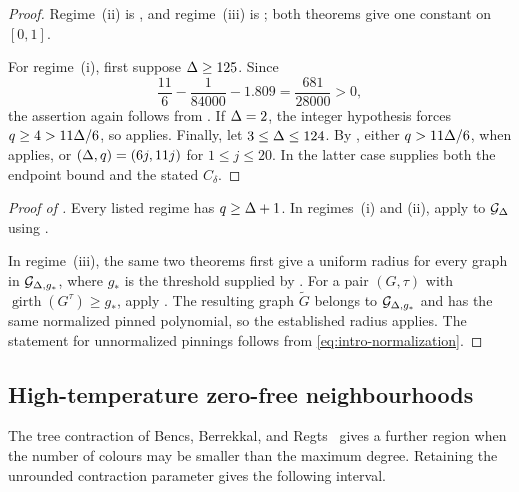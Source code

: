 \begin{proof}
Regime~\textup{(ii)} is , and regime~\textup{(iii)} is
; both theorems give one constant on
\([0,1]\).

For regime~\textup{(i)}, first suppose \(\Delta\ge125\).  Since
\[
  \frac{11}{6}-\frac1{84000}-1.809=\frac{681}{28000}>0,
\]
the assertion again follows from .  If \(\Delta=2\), the
integer hypothesis forces \(q\ge4>11\Delta/6\), so
 applies.  Finally, let \(3\le\Delta\le124\).
By , either \(q>11\Delta/6\), when
 applies, or \((\Delta,q)=(6j,11j)\) for
\(1\le j\le20\).  In the latter case
 supplies both the endpoint bound and the
stated \(C_\delta\).
\end{proof}

\begin{proof}[Proof of ]
Every listed regime has \(q\ge\Delta+1\).  In regimes~\textup{(i)} and
\textup{(ii)}, apply  to \(\mathcal{G}_{\Delta}\) using
.

In regime~\textup{(iii)}, the same two theorems first give a uniform radius
for every graph in \(\mathcal{G}_{\Delta,g_*}\), where \(g_*\) is the threshold supplied
by .  For a pair \((G,\tau)\) with
\(\operatorname{girth}(G^\tau)\ge g_*\), apply
.  The resulting graph
\(\widetilde G\) belongs to \(\mathcal{G}_{\Delta,g_*}\) and has the same normalized
pinned polynomial, so the established radius applies.  The statement for
unnormalized pinnings follows from \eqref{eq:intro-normalization}.
\end{proof}

\subsection{High-temperature zero-free neighbourhoods}

The tree contraction of Bencs, Berrekkal, and
Regts~\cite{BencsBerrekkalRegts2025Trees} gives a further region when the
number of colours may be smaller than the maximum degree.  Retaining the
unrounded contraction parameter gives the following interval.

